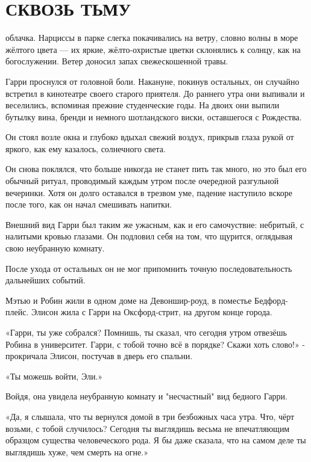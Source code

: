 \documentclass[a4paper,12pt]{book}
\begin{document}
\chapter{СКВОЗЬ ТЬМУ}
\noindent{} облачка. Нарциссы в парке слегка покачивались на ветру, словно волны в море жёлтого цвета — их яркие, жёлто-охристые цветки склонялись к солнцу, как на богослужении. Ветер доносил запах свежескошенной травы.\\
\par
Гарри проснулся от головной боли. Накануне, покинув остальных, он случайно встретил в кинотеатре своего старого приятеля. До раннего утра они выпивали и веселились, вспоминая прежние студенческие годы. На двоих они выпили бутылку вина, бренди и немного шотландского виски, оставшегося с Рождества.
\par
Он стоял возле окна и глубоко вдыхал свежий воздух, прикрыв глаза рукой от яркого, как ему казалось, солнечного света.
\par
Он снова поклялся, что больше никогда не станет пить так много, но это был его обычный ритуал, проводимый каждым утром после очередной разгульной вечеринки. Хотя он долго оставался в трезвом уме, падение наступило вскоре после того, как он начал смешивать напитки.
\par
Внешний вид Гарри был таким же ужасным, как и его самочуствие: небритый, с налитыми кровью глазами. Он подловил себя на том, что щурится, оглядывая свою неубранную комнату.
\par
После ухода от остальных он не мог припомнить точную последовательность дальнейших событий.
\par
Мэтью и Робин жили в одном доме на Девоншир-роуд, в поместье Бедфорд-плейс. Элисон жила с Гарри на Оксфорд-стрит, на другом конце города.\\
\par
«Гарри, ты уже собрался? Помнишь, ты сказал, что сегодня утром отвезёшь Робина в университет. Гарри, с тобой точно всё в порядке? Скажи хоть слово!» - прокричала Элисон, постучав в дверь его спальни.
\par
«Ты можешь войти, Эли.»
\par
Войдя, она увидела неубранную комнату и "несчастный" вид бедного Гарри.
\par
«Да, я слышала, что ты вернулся домой в три безбожных часа утра. Что, чёрт возьми, с тобой случилось? Сегодня ты выглядишь весьма не впечатляющим образцом существа человеческого рода. Я бы даже сказала, что на самом деле ты выглядишь хуже, чем смерть на огне.»
\end{document}
